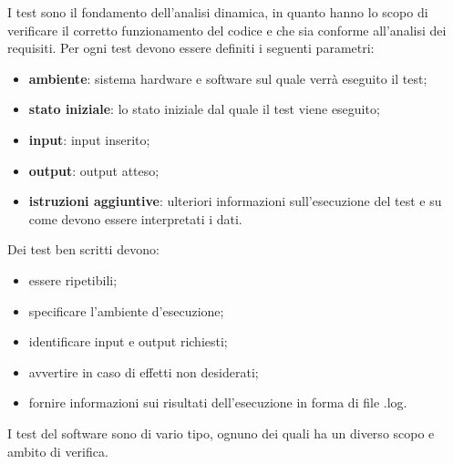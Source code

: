 I test sono il fondamento dell'analisi dinamica, in quanto hanno lo scopo di verificare il corretto funzionamento del codice e che sia conforme all'analisi dei requisiti.
Per ogni test devono essere definiti i seguenti parametri:
\begin{itemize}
    \item \textbf{ambiente}: sistema hardware e software sul quale verrà eseguito il test;
    \item \textbf{stato iniziale}: lo stato iniziale dal quale il test viene eseguito;
    \item \textbf{input}: input inserito;
    \item \textbf{output}: output atteso;
    \item \textbf{istruzioni aggiuntive}: ulteriori informazioni sull'esecuzione del test e su come devono essere interpretati i dati.
\end{itemize}
Dei test ben scritti devono:
\begin{itemize}
    \item essere ripetibili;
    \item specificare l'ambiente d'esecuzione;
    \item identificare input e output richiesti;
    \item avvertire in caso di effetti non desiderati;
    \item fornire informazioni sui risultati dell'esecuzione in forma di file {\selectfont .log}.
\end{itemize}
I test del software sono di vario tipo, ognuno dei quali ha un diverso scopo e ambito di verifica.
